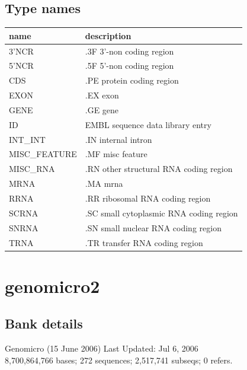 \documentclass{article}
\begin{document}
\begin{Schunk}
\subsection{Type names}
\noindent\begin{tabular}{ll}
\hline \hline
name & description\\
\hline
3'NCR & .3F  3'-non coding region \\
5'NCR & .5F  5'-non coding region \\
CDS & .PE protein coding region \\
EXON & .EX exon \\
GENE & .GE gene \\
ID & EMBL sequence data library entry \\
INT\_INT & .IN  internal intron \\
MISC\_FEATURE & .MF misc feature \\
MISC\_RNA & .RN other structural RNA coding region \\
MRNA & .MA mrna \\
RRNA & .RR ribosomal RNA coding region \\
SCRNA & .SC small cytoplasmic RNA coding region \\
SNRNA & .SN small nuclear RNA coding region \\
TRNA & .TR transfer RNA coding region \\
\hline \hline
\end{tabular}

\section{ genomicro2 }
\subsection{Bank details}
Genomicro (15 June 2006) Last Updated: Jul  6, 2006\\
8,700,864,766 bases; 272 sequences; 2,517,741 subseqs; 0 refers.\\
\\
\\



\end{Schunk}
\end{document}
